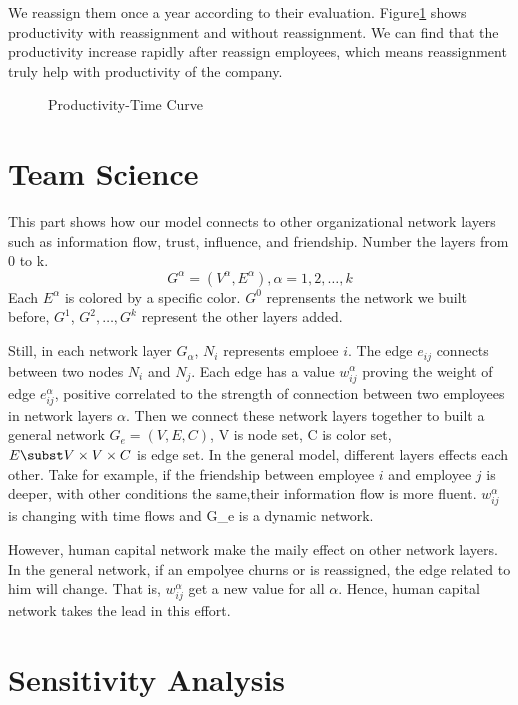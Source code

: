 \documentclass[12pt,a4paper,titlepage]{article}
\begin{document}
We reassign them once a year according to their
evaluation. Figure\ref{reassign} shows productivity with reassignment
and without reassignment. We can find that the productivity increase
rapidly after reassign employees, which means reassignment truly help
with productivity of the company.

\begin{figure}[center]
  \centering

  \caption{Productivity-Time Curve}\label{reassign}
\end{figure}

\section{Team Science}
\label{sec:team-science}

This part shows how our model connects to other organizational network
layers such as information flow, trust, influence, and
friendship. Number the layers from 0 to
k. $$G^\alpha=(V^\alpha,E^\alpha), \alpha=1,2,\ldots,k$$ Each
$E^\alpha$ is colored by a specific color. $G^0$ reprensents the
network we built before, $G^1$, $G^2, \ldots ,G^k$ represent the other layers added.

Still, in each network layer $G_\alpha$, $N_i$ represents emploee
$i$. The edge $e_{ij}$ connects between two nodes $N_i$ and
$N_j$. Each edge has a value $w_{ij}^\alpha$ proving the weight of
edge $e_{ij}^\alpha$, positive correlated to the strength of
connection between two employees in network layers $\alpha$. Then we
connect these network layers together to built a general network
$G_e=(V, E, C)$, V is node set, C is color set, $E\subst V\times
V\times C$ is edge set. In the general model, different layers effects
each other. Take for example, if the friendship between employee $i$
and employee $j$ is deeper, with other conditions the same,their
information flow is more fluent. $w_{ij}^\alpha$ is changing with time
flows and G_e is a dynamic network.

However, human capital network make the maily effect on other network
layers. In the general network, if an empolyee churns or is
reassigned, the edge related to him will change. That is,
$w_{ij}^\alpha$ get a new value for all $\alpha$. Hence, human capital
network takes the lead in this effort.

\section{Sensitivity Analysis}
\label{sec:sensitivity-analysis}
\end{document}
